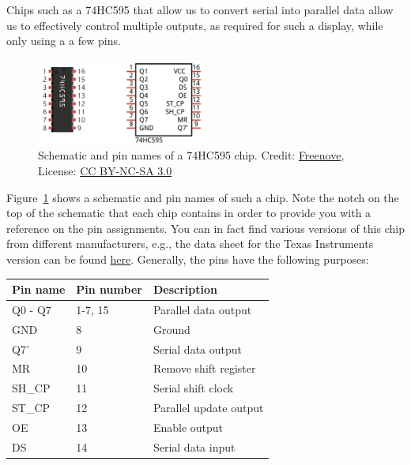Chips such as a 74HC595 that allow us to convert serial into parallel data allow us to effectively control multiple outputs, as required for such a display, while only using a a few pins.
\begin{figure}[tb]
    \centering
    \includegraphics[width=0.5\textwidth]{graphics/02_display/74hc595.png}
    \caption{Schematic and pin names of a 74HC595 chip. Credit: \href{https://github.com/Freenove/Freenove_Ultimate_Starter_Kit}{Freenove}, License: \href{https://www.creativecommons.org/licenses/by-nc-sa/3.0/deed.en_US}{CC BY-NC-SA 3.0}}
    \label{fig:display:74hc595}
\end{figure}
Figure~\ref{fig:display:74hc595} shows a schematic and pin names of such a chip. Note the notch on the top of the schematic that each chip contains in order to provide you with a reference on the pin assignments. You can in fact find various versions of this chip from different manufacturers, e.g., the data sheet for the Texas Instruments version can be found \href{https://www.ti.com/lit/ds/symlink/sn74hc595.pdf?ts=1636228778140&ref_url=https%253A%252F%252Fwww.google.com%252F}{here}. Generally, the pins have the following purposes:

\begin{center}
\begin{tabular}{lll}
    \hline
    \textbf{Pin name}   &   \textbf{Pin number} &   \textbf{Description}    \\
    \hline \hline
    Q0 - Q7             &   1-7, 15             &   Parallel data output \\
    GND                 &   8                   &   Ground \\
    Q7'                 &   9                   &   Serial data output \\
    MR                  &   10                  &   Remove shift register \\
    SH\_CP              &   11                  &   Serial shift clock \\
    ST\_CP              &   12                  &   Parallel update output \\
    OE                  &   13                  &   Enable output \\
    DS                  &   14                  &   Serial data input \\
    \hline
\end{tabular}
\end{center}

